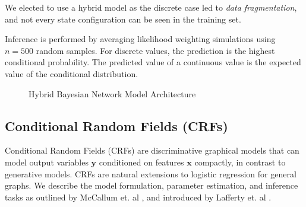 \documentclass{article}
\begin{document}
We elected to use a hybrid model as the discrete case led to
\textit{data fragmentation}, and not every state configuration can be seen
in the training set.

Inference is performed by averaging likelihood weighting simulations using
$n=500$ random samples. For discrete values, the prediction is the highest
conditional probability. The predicted value of a continuous value is the
expected value of the conditional distribution.

\begin{figure}
  \centering
  \caption{Hybrid Bayesian Network Model Architecture}
  \label{fig:net-structure}
\end{figure}

\subsection{Conditional Random Fields (CRFs)}
\label{sec:CRF}
Conditional Random Fields (CRFs) are discriminative graphical models that
can model output variables $\mathbf{y}$ conditioned on features $\mathbf{x}$
compactly, in contrast to generative models. CRFs are natural extensions
to logistic regression for general graphs. We describe the model formulation,
parameter estimation, and inference tasks as outlined by McCallum et. al \cite{McCallumCRF},
and introduced by Lafferty et. al \cite{CRF}.
\end{document}
